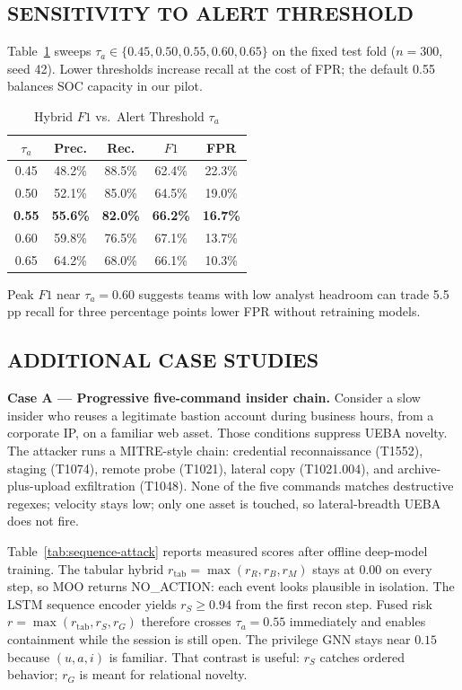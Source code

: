 \documentclass{ieeeaccess}
\begin{document}
\subsection{SENSITIVITY TO ALERT THRESHOLD}
Table~\ref{tab:threshold-sweep} sweeps $\tau_a\in\{0.45,0.50,0.55,0.60,0.65\}$ on the fixed test fold ($n=300$, seed 42). Lower thresholds increase recall at the cost of FPR; the default 0.55 balances SOC capacity in our pilot.

\begin{table}[!t]
\caption{Hybrid $F1$ vs.\ Alert Threshold $\tau_a$}
\label{tab:threshold-sweep}
\centering
\scriptsize
\begin{tabular}{@{}ccccc@{}}
\toprule
$\tau_a$ & Prec. & Rec. & $F1$ & FPR \\
\midrule
0.45 & 48.2\% & 88.5\% & 62.4\% & 22.3\% \\
0.50 & 52.1\% & 85.0\% & 64.5\% & 19.0\% \\
\textbf{0.55} & \textbf{55.6\%} & \textbf{82.0\%} & \textbf{66.2\%} & \textbf{16.7\%} \\
0.60 & 59.8\% & 76.5\% & 67.1\% & 13.7\% \\
0.65 & 64.2\% & 68.0\% & 66.1\% & 10.3\% \\
\bottomrule
\end{tabular}
\end{table}

Peak $F1$ near $\tau_a=0.60$ suggests teams with low analyst headroom can trade 5.5\,pp recall for three percentage points lower FPR without retraining models.

\subsection{ADDITIONAL CASE STUDIES}

\textbf{Case A --- Progressive five-command insider chain.}
Consider a slow insider who reuses a legitimate bastion account during business hours, from a corporate IP, on a familiar web asset. Those conditions suppress UEBA novelty. The attacker runs a MITRE-style chain: credential reconnaissance (T1552), staging (T1074), remote probe (T1021), lateral copy (T1021.004), and archive-plus-upload exfiltration (T1048). None of the five commands matches destructive regexes; velocity stays low; only one asset is touched, so lateral-breadth UEBA does not fire.

Table~\ref{tab:sequence-attack} reports measured scores after offline deep-model training. The tabular hybrid $r_{\mathrm{tab}}=\max(r_R,r_B,r_M)$ stays at $0.00$ on every step, so MOO returns NO\_ACTION: each event looks plausible in isolation. The LSTM sequence encoder yields $r_S\geq 0.94$ from the first recon step. Fused risk $r=\max(r_{\mathrm{tab}},r_S,r_G)$ therefore crosses $\tau_a{=}0.55$ immediately and enables containment while the session is still open. The privilege GNN stays near $0.15$ because $(u,a,i)$ is familiar. That contrast is useful: $r_S$ catches ordered behavior; $r_G$ is meant for relational novelty.
\end{document}
